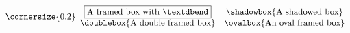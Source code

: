 \documentclass{article}
\begin{document}
\[
  \cornersize{0.2}
  \begin{array}{cc}
    \fbox{\text{A framed box with \textdbend}}&\shadowbox{\text{A shadowed box}}\cr
    \doublebox{\text{A double framed box}}&\ovalbox{\text{An oval framed box}}\cr
  \end{array}
\]
\end{document}
